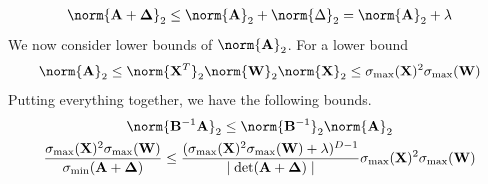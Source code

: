         \begin{gather*}
             \norm{\mathbf{\mathbf{A} + \Delta}}_2 \leq \norm{\mathbf{A}}_2 + \norm{\Delta}_2 
            = \norm{\mathbf{A}}_2 + \lambda
        \end{gather*}
        We now consider lower bounds of $\norm{\mathbf{A}}_2$. For a lower bound%
        \begin{gather*}
            \norm{\mathbf{A}}_2 \leq \norm{\mathbf{X}^T}_2 \norm{\mathbf{W}}_2 \norm{\mathbf{X}}_2 \leq \sigma_{\max}(\mathbf{X})^2 \sigma_{\max}(\mathbf{W})
        \end{gather*}
        Putting everything together, we have the following bounds.
        \begin{gather*}
            \norm{\mathbf{B}^{-1} \mathbf{A}}_2  \leq \norm{\mathbf{B}^{-1}}_2 \norm{\mathbf{A}}_2  \\
             \frac{\sigma_{\max}(\mathbf{X})^2 \sigma_{\max}(\mathbf{W})}{\sigma_{\min}(\mathbf{\mathbf{A} + \Delta})}
            \leq \frac{(\sigma_{\max}(\mathbf{X})^2 \sigma_{\max}(\mathbf{W}) + \lambda)^{D-1}}{\mid \det(\mathbf{\mathbf{A} + \Delta})\mid} \sigma_{\max}(\mathbf{X})^2 \sigma_{\max}(\mathbf{W})
        \end{gather*}

